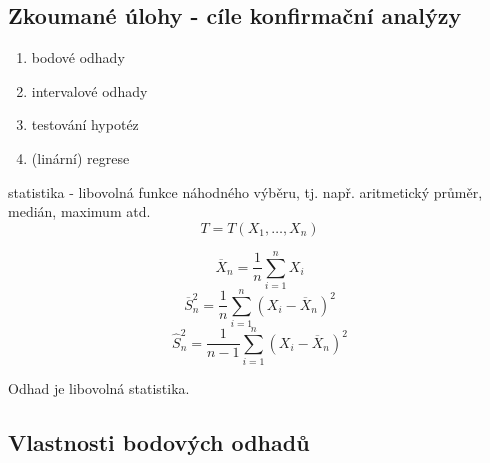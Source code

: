 \documentclass[../main.tex]{subfiles}
\begin{document}
\subsection{Zkoumané úlohy - cíle konfirmační analýzy}
\begin{enumerate}
    \item bodové odhady
    \item intervalové odhady
    \item testování hypotéz
    \item (linární) regrese
\end{enumerate}
\begin{definition}
    statistika - libovolná funkce náhodného výběru, tj. např. aritmetický průměr, medián, maximum atd.
    \[ T = T(X_1, \dots , X_n) \]
\end{definition}

\begin{example}
    \[\overline{X}_n = \frac{1}{n}\sum^n_{i=1}X_i\]
    \[\overline{S}^2_n = \frac{1}{n}\sum^n_{i=1}(X_i - \overline{X}_n)^2\]
    \[\widehat{S}^2_n = \frac{1}{n-1}\sum^n_{i=1}(X_i - \overline{X}_n)^2 \]
\end{example}
\begin{definition}
    Odhad je libovolná statistika.
\end{definition}

\subsection{Vlastnosti bodových odhadů}
\end{document}
